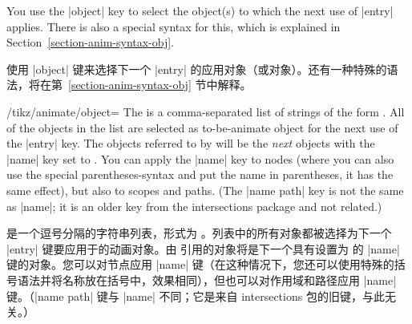 You use the |object| key to select the object(s) to which the next use of
|entry| applies. There is also a special syntax for this, which is explained in
Section~\ref{section-anim-syntax-obj}.

使用 |object| 键来选择下一个 |entry| 的应用对象（或对象）。还有一种特殊的语法，将在第~\ref{section-anim-syntax-obj} 节中解释。

\begin{key}{/tikz/animate/object=}
    The  is a comma-separated list of strings of the form
    . All of the objects in the list are
    selected as to-be-animate object for the next use of the |entry| key. The
    objects referred to by  will be the \emph{next} objects with
    the |name| key set to . You can apply the |name| key to nodes
    (where you can also use the special parentheses-syntax and put the name in
    parentheses, it has the same effect), but also to scopes and paths. (The
    |name path| key is not the same as |name|; it is an older key from the
    intersections package and not related.)
    
     是一个逗号分隔的字符串列表，形式为 。列表中的所有对象都被选择为下一个 |entry| 键要应用于的动画对象。由  引用的对象将是下一个具有设置为  的 |name| 键的对象。您可以对节点应用 |name| 键（在这种情况下，您还可以使用特殊的括号语法并将名称放在括号中，效果相同），但也可以对作用域和路径应用 |name| 键。（|name path| 键与 |name| 不同；它是来自 intersections 包的旧键，与此无关。）


\begin{codeexample}[
    preamble={\usetikzlibrary{animations}},
    animation list={0.5,1,1.5,2},
]
\end{codeexample}
\begin{codeexample}[
    preamble={\usetikzlibrary{animations}},
    animation list={0.5,1,1.5,2},
]
\end{codeexample}


\end{key}

